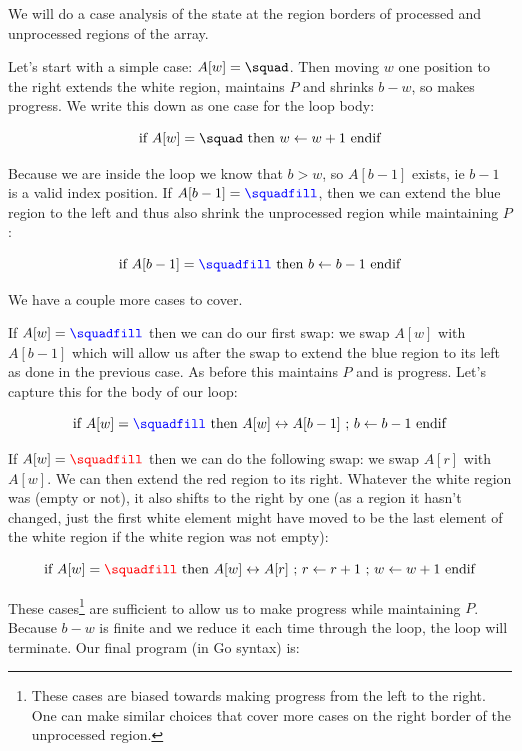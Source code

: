 We will do a case analysis of the state at the region borders of processed and unprocessed regions of the array.

Let's start with a simple case: $A[w] = \squad$. Then moving $w$ one position to the right extends the white region, maintains $P$ and shrinks $b - w$, so makes progress. We write this down as one case for the loop body:

$$
\text{if } A[w] = \squad \text{ then } w \leftarrow w + 1 \text{ endif}
$$

Because we are inside the loop we know that $b > w$, so $A[b - 1]$ exists, ie $b - 1$ is a valid index position. If $A[b - 1] = {\color{blue} \squadfill}$, then we can extend the blue region to the left and thus also shrink the unprocessed region while maintaining $P$:

$$
\text{if } A[b - 1] = {\color{blue} \squadfill} \text{ then } b \leftarrow b - 1 \text{ endif}
$$

We have a couple more cases to cover.

If $A[w] = {\color{blue} \squadfill}$ then we can do our first swap: we swap $A[w]$ with $A[b-1]$ which will allow us after the swap to extend the blue region to its left as done in the previous case. As before this maintains $P$ and is progress. Let's capture this for the body of our loop:

$$
\text{if } A[w] = {\color{blue} \squadfill} \text{ then } A[w] \leftrightarrow A[b-1] \text{ ; } b \leftarrow b - 1 \text{ endif}
$$

If $A[w] = {\color{red} \squadfill}$ then we can do the following swap: we swap $A[r]$ with $A[w]$. We can then extend the red region to its right. Whatever the white region was (empty or not), it also shifts to the right by one (as a region it hasn't changed, just the first white element might have moved to be the last element of the white region if the white region was not empty):

$$
\text{if } A[w] = {\color{red} \squadfill} \text{ then } A[w] \leftrightarrow A[r] \text{ ; } r \leftarrow r + 1 \text{ ; } w \leftarrow w + 1 \text{ endif}
$$

These cases\footnote{These cases are biased towards making progress from the left to the right. One can make similar choices that cover more cases on the right border of the unprocessed region.} are sufficient to allow us to make progress while maintaining $P$. Because $b-w$ is finite and we reduce it each time through the loop, the loop will terminate. Our final program (in Go syntax) is:

